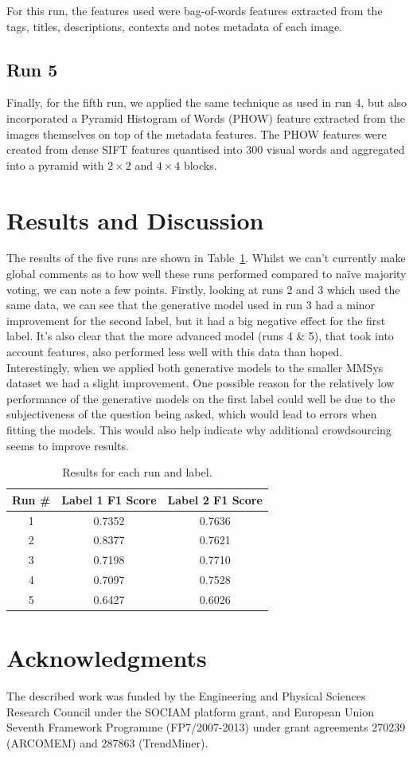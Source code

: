 \documentclass{../acm_proc_article-me11_tweaked}
\begin{document}
For this run, the features used were bag-of-words features extracted from the tags, titles, descriptions, contexts and notes metadata of each image.

\subsection{Run 5}
Finally, for the fifth run, we applied the same technique as used in run 4, but also incorporated a Pyramid Histogram of Words (PHOW) feature extracted from the images themselves on top of the metadata features. The PHOW features were created from dense SIFT features quantised into 300 visual words and aggregated into a pyramid with $2{\times}2$ and $4{\times}4$ blocks.

\section{Results and Discussion}
The results of the five runs are shown in Table~\ref{tab:results}. Whilst we can't currently make global comments as to how well these runs performed compared to na\"ive majority voting, we can note a few points. Firstly, looking at runs 2 and 3 which used the same data, we can see that the generative model used in run 3 had a minor improvement for the second label, but it had a big negative effect for the first label. It's also clear that the more advanced model (runs 4 \& 5), that took into account features, also performed less well with this data than hoped. Interestingly, when we applied both generative models to the smaller MMSys dataset we had a slight improvement. One possible reason for the relatively low performance of the generative models on the first label could well be due to the subjectiveness of the question being asked, which would lead to errors when fitting the models. This would also help indicate why additional crowdsourcing seems to improve results.

\begin{table}
	\small
	\centering
	\caption{\label{tab:results}Results for each run and label.}
	\begin{tabular}{|c|c|c|}
		\hline
		Run \# & Label 1 F1 Score & Label 2 F1 Score \\ \hline \hline
		1 & 0.7352 & 0.7636 \\ \hline
		2 & 0.8377 & 0.7621 \\ \hline
		3 & 0.7198 & 0.7710 \\ \hline
		4 & 0.7097 & 0.7528 \\ \hline
		5 & 0.6427 & 0.6026 \\ \hline
	\end{tabular}
\end{table}

\section{Acknowledgments}
The described work was funded by the Engineering and Physical Sciences Research Council under the SOCIAM platform grant, and European Union Seventh Framework Programme (FP7/2007-2013) under grant agreements 270239 (ARCOMEM) and 287863 (TrendMiner).



\end{document}
